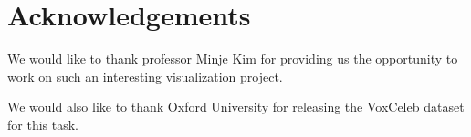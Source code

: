 \documentclass[letterpaper]{article}
\begin{document}




\section{Acknowledgements}
We would like to thank professor Minje Kim for providing us the opportunity to work on such an interesting visualization project. 

We would also like to thank Oxford University for releasing the VoxCeleb dataset for this task.



\end{document}
